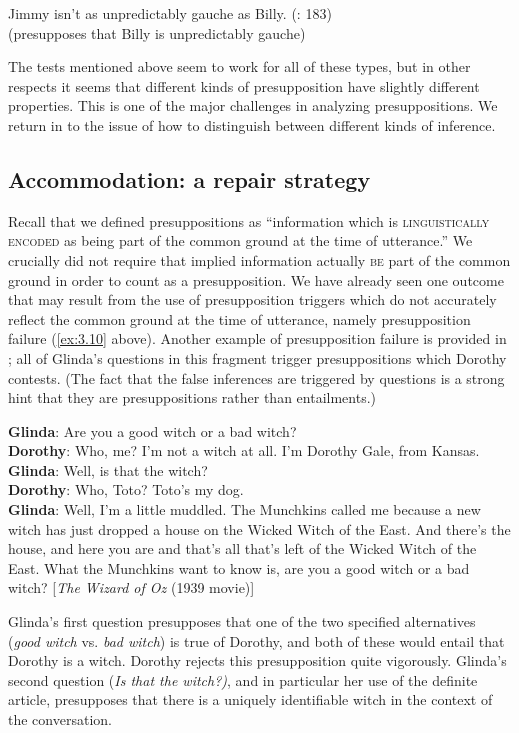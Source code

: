   \ex Jimmy isn’t as unpredictably gauche as Billy.   (\citealt{Levinson1983}: 183)\\
  (presupposes that Billy is unpredictably gauche)
                       \z
                       \z


The tests mentioned above seem to work for all of these types, but in other respects it seems that different kinds of presupposition have slightly different properties. This is one of the major challenges in analyzing presuppositions. We return in  to the issue of how to distinguish between different kinds of inference.


\subsection{Accommodation: a repair strategy}\label{sec:3.4.2}

Recall that we defined presuppositions as “information which is \textsc{linguistically encoded} as being part of the common ground at the time of utterance.” We crucially did not require that implied information actually \textsc{be} part of the common ground in order to count as a presupposition. We have already seen one outcome that may result from the use of presupposition triggers which do not accurately reflect the common ground at the time of utterance, namely presupposition failure (\ref{ex:3.10} above). Another example of presupposition failure is provided in ; all of Glinda’s questions in this fragment trigger presuppositions which Dorothy contests. (The fact that the false inferences are triggered by questions is a strong hint that they are presuppositions rather than entailments.)


\ea \label{ex:3.15}
\textbf{Glinda}: Are you a good witch or a bad witch?\\
\textbf{Dorothy}: Who, me?  I’m not a witch at all.  I’m Dorothy Gale, from Kansas.\\
\textbf{Glinda}: Well, is that the witch?\\
\textbf{Dorothy}: Who, Toto?  Toto’s my dog.\\
\textbf{Glinda}: Well, I’m a little muddled. The Munchkins called me because a new witch has just dropped a house on the Wicked Witch of the East. And there’s the house, and here you are and that’s all that’s left of the Wicked Witch of the East. What the Munchkins want to know is, are you a good witch or a bad witch?   [\textit{The Wizard of Oz} (1939 movie)]
\z


Glinda’s first question presupposes that one of the two specified alternatives (\textit{good witch} vs. \textit{bad witch}) is true of Dorothy, and both of these would entail that Dorothy is a witch. Dorothy rejects this presupposition quite vigorously. Glinda’s second question (\textit{Is that the witch?)}, and in particular her use of the definite article, presupposes that there is a uniquely identifiable witch in the context of the conversation.



